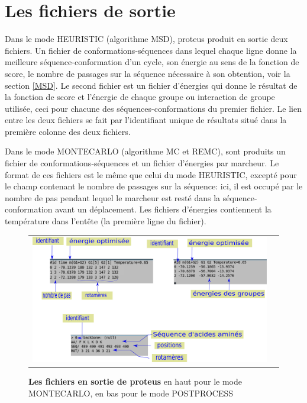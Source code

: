 \section{Les fichiers de sortie}
\label{proteusIO}
Dans le mode HEURISTIC (algorithme MSD), proteus produit en sortie deux fichiers. Un fichier de conformations-séquences dans lequel chaque ligne donne la meilleure séquence-conformation d'un cycle, son énergie au sens de la fonction de score, le nombre de passages sur la séquence nécessaire à son obtention, voir la section \vref{MSD}. Le second fichier est un fichier d'énergies qui donne le résultat de la fonction de score et l'énergie de chaque groupe ou interaction de groupe utilisée, ceci pour chacune des séquences-conformations du premier fichier. Le lien entre les deux fichiers se fait par l'identifiant unique de résultats situé dans la première colonne des deux fichiers.

Dans le mode MONTECARLO (algorithme MC et REMC), sont produits un fichier de conformations-séquences et un fichier d'énergies par marcheur. Le format de ces fichiers est le même que celui du mode HEURISTIC, excepté pour le champ contenant le nombre de passages sur la séquence: ici, il est occupé par le nombre de pas pendant lequel le marcheur est resté dans la séquence-conformation avant un déplacement. Les fichiers d'énergies contiennent la température dans l'entête (la première ligne du fichier).

   \begin{figure}[!htbp]
     \centering
     \begin{tabular}{cc}
       \includegraphics[width=14cm]{figure/output.png} &
     \end{tabular}
     
     \caption{\textbf{Les fichiers en sortie de proteus} en haut pour le mode MONTECARLO, en bas pour le mode POSTPROCESS}
\label{proteusoutput}
   \end{figure}

